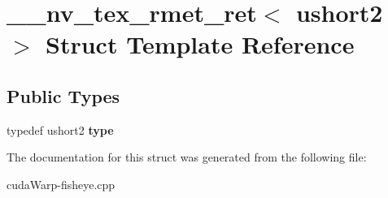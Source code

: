 \hypertarget{struct____nv__tex__rmet__ret_3_01ushort2_01_4}{}\section{\+\_\+\+\_\+nv\+\_\+tex\+\_\+rmet\+\_\+ret$<$ ushort2 $>$ Struct Template Reference}
\label{struct____nv__tex__rmet__ret_3_01ushort2_01_4}
\subsection*{Public Types}
\begin{DoxyCompactItemize}
\item 
typedef ushort2 {\bfseries type}\hypertarget{struct____nv__tex__rmet__ret_3_01ushort2_01_4_a1d42e70fdf928783fe8e660bf586f7aa}{}\label{struct____nv__tex__rmet__ret_3_01ushort2_01_4_a1d42e70fdf928783fe8e660bf586f7aa}

\end{DoxyCompactItemize}


The documentation for this struct was generated from the following file\+:\begin{DoxyCompactItemize}
\item 
cuda\+Warp-\/fisheye.\+cpp\end{DoxyCompactItemize}

